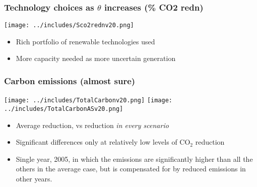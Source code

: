 \documentclass[xcolor=dvipsnames]{beamer}
\newcommand{\exclude}[1]{}
\begin{document}
\begin{frame}
  \frametitle{Technology choices as $\theta$ increases (\% CO2 redn)}

  \texttt{[image: ../includes/Sco2rednv20.png]} \\
  \begin{itemize}
  \item Rich portfolio of renewable technologies used
  \item More capacity needed as more uncertain generation
  \end{itemize}
\end{frame}

\exclude{
\begin{frame}
  \frametitle{Technology choices as carbon price (\$ per MW) increases}

  \texttt{[image: ../includes/Sco2incrv20.png]}
\end{frame}

\begin{frame}
  \frametitle{CO2 reduction (constraint or carbon tax)}

    \texttt{[image: ../includes/TotalCarbonSinglev20.png]}
    \texttt{[image: ../includes/TotalCarbonincrv20.png]}

\end{frame}
}

\begin{frame}
  \frametitle{Carbon emissions (almost sure)}

\texttt{[image: ../includes/TotalCarbonv20.png]}
\texttt{[image: ../includes/TotalCarbonASv20.png]}

\begin{itemize}
\item Average reduction, vs reduction {\em in every scenario}
\item Significant differences only at relatively low levels of CO$_{2}$
reduction
\item Single year, 2005, in which the emissions are significantly higher
than all the others in the average case, but is compensated for by
reduced emissions in other  years.
\end{itemize}
\end{frame}
\end{document}
